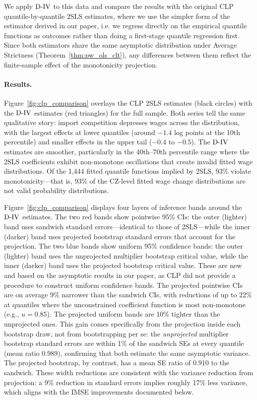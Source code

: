 \documentclass[12pt]{article}
\newcommand{\est}{\ensuremath{\textnormal{D-IV}}\xspace}
\newcommand{\CLP}{CLP\xspace}
\begin{document}
We apply \est to this data and compare the results with the original \CLP quantile-by-quantile 2SLS estimates, where we use the simpler form of the estimator derived in our paper, i.e. we regress directly on the empirical quantile functions as outcomes rather than doing a first-stage quantile regression first. Since both estimators share the same asymptotic distribution under Average Strictness (Theorem~\ref{thm:pw_ols_clt}), any differences between them reflect the finite-sample effect of the monotonicity projection.

\paragraph{Results.} Figure~\ref{fig:clp_comparison} overlays the \CLP 2SLS estimates (black circles) with the \est estimates (red triangles) for the full sample. Both series tell the same qualitative story: import competition depresses wages across the distribution, with the largest effects at lower quantiles (around $-1.4$ log points at the 10th percentile) and smaller effects in the upper tail ($-0.4$ to $-0.5$). The \est estimates are smoother, particularly in the 40th--70th percentile range where the 2SLS coefficients exhibit non-monotone oscillations that create invalid fitted wage distributions. Of the 1,444 fitted quantile functions implied by 2SLS, 93\% violate monotonicity---that is, 93\% of the CZ-level fitted wage change distributions are not valid probability distributions.

Figure~\ref{fig:clp_comparison} displays four layers of inference bands around the \est estimates. The two red bands show pointwise 95\% CIs: the outer (lighter) band uses sandwich standard errors---identical to those of 2SLS---while the inner (darker) band uses projected bootstrap standard errors that account for the projection. The two blue bands show uniform 95\% confidence bands: the outer (lighter) band uses the unprojected multiplier bootstrap critical value, while the inner (darker) band uses the projected bootstrap critical value. These are new and based on the asymptotic results in our paper, as CLP did not provide a procedure to construct uniform confidence bands. The projected pointwise CIs are on average 9\% narrower than the sandwich CIs, with reductions of up to 22\% at quantiles where the unconstrained coefficient function is most non-monotone (e.g., $u = 0.85$). The projected uniform bands are 10\% tighter than the unprojected ones. This gain comes specifically from the projection inside each bootstrap draw, not from bootstrapping per se: the \emph{unprojected} multiplier bootstrap standard errors are within 1\% of the sandwich SEs at every quantile (mean ratio 0.989), confirming that both estimate the same asymptotic variance. The projected bootstrap, by contrast, has a mean SE ratio of 0.910 to the sandwich. These width reductions are consistent with the variance reduction from projection: a 9\% reduction in standard errors implies roughly 17\% less variance, which aligns with the IMSE improvements documented below.
\end{document}
